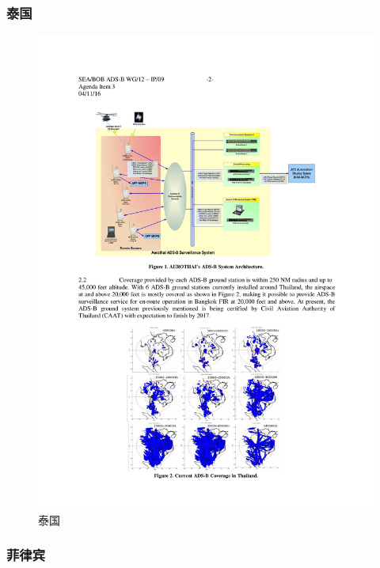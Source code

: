 \begin{figure}[htbp]

\end{figure}

\subsubsection{泰国}

\begin{figure}[htbp]
\centering
\includegraphics[width=13cm]{pic/thailand.pdf}
\caption{泰国}
\label{fig:thailand}
\end{figure}

\subsubsection{菲律宾}

